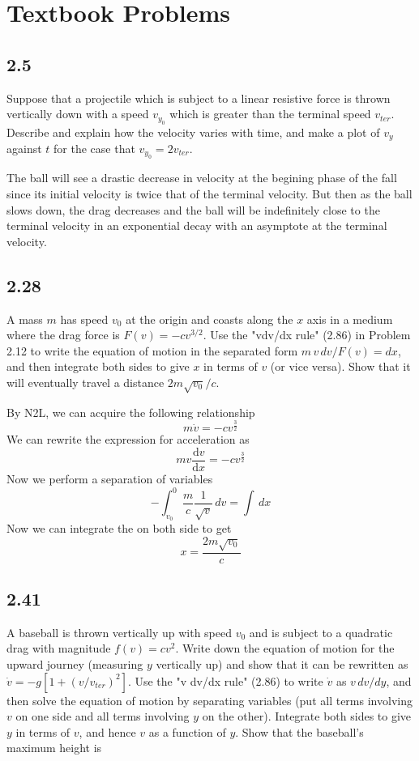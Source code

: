 \documentclass[12pt]{article}
\newcommand{\dydx}[2]{\frac{\text{d} #1}{\text{d} #2}}
\begin{document}
\section{Textbook Problems}
\subsection{2.5}
Suppose that a projectile which is subject to a linear resistive force is thrown vertically down with a speed $v_{y_0}$ which is greater than the terminal speed $v_{ter}$. Describe and explain how the velocity varies with time, and make a plot of $v_y$ against $t$ for the case that $v_{y_0} = 2v_{ter}$.

The ball will see a drastic decrease in velocity at the begining phase of the fall since its initial velocity is twice that of the terminal velocity. But then as the ball slows down, the drag decreases and the ball will be indefinitely close to the terminal velocity in an exponential decay with an asymptote at the terminal velocity.  

\subsection{2.28}
A mass $m$ has speed $v_0$ at the origin and coasts along the $x$ axis in a medium where the drag force is $F(v) = -cv^{3/2}$. Use the "vdv/dx rule" (2.86) in Problem 2.12 to write the equation of motion in the separated form $m \, v \, dv / F(v) = dx$, and then integrate both sides to give $x$ in terms of $v$ (or vice versa). Show that it will eventually travel a distance $2m\sqrt{v_0}/c$.

By N2L, we can acquire the following relationship
\[
m\dot{v} = -cv^{\frac{3}{2}}
\]
We can rewrite the expression for acceleration as
\[
mv\dydx{v}{x} = -cv^{\frac{3}{2}}
\]
Now we perform a separation of variables
\[
-\int_{v_0}^{0}\frac{m}{c}\frac{1}{\sqrt{v}}\,dv = \int\,dx
\]
Now we can integrate the on both side to get
\[
x = \frac{2m\sqrt{v_0}}{c}
\]



\subsection{2.41}
A baseball is thrown vertically up with speed $v_0$ and is subject to a quadratic drag with magnitude $f(v) = cv^2$. Write down the equation of motion for the upward journey (measuring $y$ vertically up) and show that it can be rewritten as $\dot{v} = -g[1 + (v/v_{ter})^2]$. Use the "v dv/dx rule" (2.86) to write $\dot{v}$ as $v \, dv/dy$, and then solve the equation of motion by separating variables (put all terms involving $v$ on one side and all terms involving $y$ on the other). Integrate both sides to give $y$ in terms of $v$, and hence $v$ as a function of $y$. Show that the baseball's maximum height is
\end{document}
